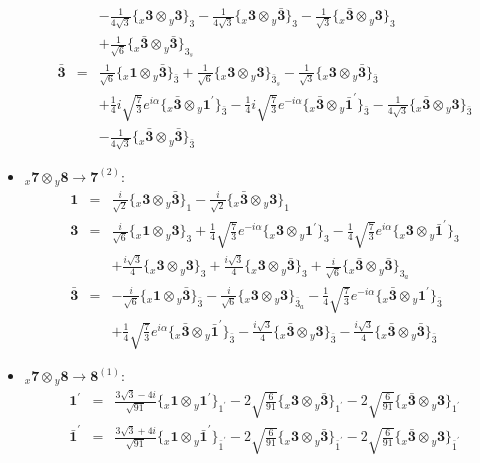 \documentclass[english]{article}
\newcommand{\rep}[1]{\mathbf{#1}}
\newcommand{\repx}[2]{{}_{#2}\mathbf{#1}}
\newcommand{\subcg}[3]{\big\{ \repx{#1}{x}\otimes\repx{#2}{y}\big\}^{}_{#3}}
\begin{document}
\begin{itemize}
\begin{eqnarray*}
 & & -\frac{1}{4 \sqrt{3}}\subcg{3}{3}{3}-\frac{1}{4 \sqrt{3}}\subcg{3}{\bar{3}}{3}-\frac{1}{\sqrt{3}}\subcg{\bar{3}}{3}{3} \\ 
 & & +\frac{1}{\sqrt{6}}\subcg{\bar{3}}{\bar{3}}{3_{s}}
\\
\rep{\bar{3}} &=& \frac{1}{\sqrt{6}}\subcg{1}{\bar{3}}{\bar{3}}+\frac{1}{\sqrt{6}}\subcg{3}{3}{\bar{3}_{s}}-\frac{1}{\sqrt{3}}\subcg{3}{\bar{3}}{\bar{3}} \\ 
 & & +\frac{1}{4} i \sqrt{\frac{7}{3}} e^{i \alpha }\subcg{\bar{3}}{1^{\prime}}{\bar{3}}-\frac{1}{4} i \sqrt{\frac{7}{3}} e^{-i \alpha }\subcg{\bar{3}}{\bar{1}^{\prime}}{\bar{3}}-\frac{1}{4 \sqrt{3}}\subcg{\bar{3}}{3}{\bar{3}} \\ 
 & & -\frac{1}{4 \sqrt{3}}\subcg{\bar{3}}{\bar{3}}{\bar{3}}
\end{eqnarray*}
\item $\repx{7}{x}\otimes\repx{8}{y}\to\rep{7}^{(2)}$:
\begin{eqnarray*}
\rep{1} &=& \frac{i}{\sqrt{2}}\subcg{3}{\bar{3}}{1}-\frac{i}{\sqrt{2}}\subcg{\bar{3}}{3}{1}
\\
\rep{3} &=& \frac{i}{\sqrt{6}}\subcg{1}{3}{3}+\frac{1}{4} \sqrt{\frac{7}{3}} e^{-i \alpha }\subcg{3}{1^{\prime}}{3}-\frac{1}{4} \sqrt{\frac{7}{3}} e^{i \alpha }\subcg{3}{\bar{1}^{\prime}}{3} \\ 
 & & +\frac{i \sqrt{3}}{4}\subcg{3}{3}{3}+\frac{i \sqrt{3}}{4}\subcg{3}{\bar{3}}{3}+\frac{i}{\sqrt{6}}\subcg{\bar{3}}{\bar{3}}{3_{a}}
\\
\rep{\bar{3}} &=& -\frac{i}{\sqrt{6}}\subcg{1}{\bar{3}}{\bar{3}}-\frac{i}{\sqrt{6}}\subcg{3}{3}{\bar{3}_{a}}-\frac{1}{4} \sqrt{\frac{7}{3}} e^{-i \alpha }\subcg{\bar{3}}{1^{\prime}}{\bar{3}} \\ 
 & & +\frac{1}{4} \sqrt{\frac{7}{3}} e^{i \alpha }\subcg{\bar{3}}{\bar{1}^{\prime}}{\bar{3}}-\frac{i \sqrt{3}}{4}\subcg{\bar{3}}{3}{\bar{3}}-\frac{i \sqrt{3}}{4}\subcg{\bar{3}}{\bar{3}}{\bar{3}}
\end{eqnarray*}
\item $\repx{7}{x}\otimes\repx{8}{y}\to\rep{8}^{(1)}$:
\begin{eqnarray*}
\rep{1^{\prime}} &=& \frac{3 \sqrt{3}-4 i}{\sqrt{91}}\subcg{1}{1^{\prime}}{1^{\prime}}-2 \sqrt{\frac{6}{91}}\subcg{3}{\bar{3}}{1^{\prime}}-2 \sqrt{\frac{6}{91}}\subcg{\bar{3}}{3}{1^{\prime}}
\\
\rep{\bar{1}^{\prime}} &=& \frac{3 \sqrt{3}+4 i}{\sqrt{91}}\subcg{1}{\bar{1}^{\prime}}{\bar{1}^{\prime}}-2 \sqrt{\frac{6}{91}}\subcg{3}{\bar{3}}{\bar{1}^{\prime}}-2 \sqrt{\frac{6}{91}}\subcg{\bar{3}}{3}{\bar{1}^{\prime}}

\end{eqnarray*}
\end{itemize}
\end{document}
